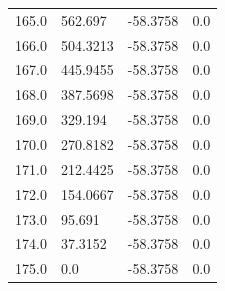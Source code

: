 \begin{table}[H]
\begin{tabular}{llll}
165.0 & 562.697 & -58.3758 & 0.0 \\
166.0 & 504.3213 & -58.3758 & 0.0 \\
167.0 & 445.9455 & -58.3758 & 0.0 \\
168.0 & 387.5698 & -58.3758 & 0.0 \\
169.0 & 329.194 & -58.3758 & 0.0 \\
170.0 & 270.8182 & -58.3758 & 0.0 \\
171.0 & 212.4425 & -58.3758 & 0.0 \\
172.0 & 154.0667 & -58.3758 & 0.0 \\
173.0 & 95.691 & -58.3758 & 0.0 \\
174.0 & 37.3152 & -58.3758 & 0.0 \\
175.0 & 0.0 & -58.3758 & 0.0 \\
\bottomrule
\end{tabular}

\end{table}
